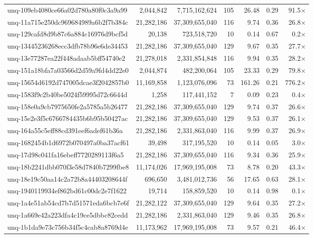 \begin{table}[h!]
\begin{tabular}{lrrrrrr}
unq-109eb4080ce66a02d780a80f0c3a9a99 & 2,044,842 & 7,715,162,624 & 105 & 26.48 & 0.29 & 91.5$\times$ \\
unq-11a715e250dc969684989a6b2f7b384c & 21,282,186 & 37,309,655,040 & 116 & 9.74 & 0.36 & 26.8$\times$ \\
unq-129cafd8d9b87c6a884c16976d9bcf5d & 20,138 & 723,518,720 & 10 & 0.14 & 0.67 & 0.2$\times$ \\
unq-13445236268ecc3dfb78b96e6de34453 & 21,282,186 & 37,309,655,040 & 129 & 9.67 & 0.35 & 27.7$\times$ \\
unq-13e77287ea22f448adaab5bff54740e2 & 21,278,018 & 2,331,854,848 & 116 & 9.94 & 0.35 & 28.2$\times$ \\
unq-151a18bfa7a03566d2d59a9fd4dd22e0 & 2,044,874 & 482,200,064 & 105 & 23.33 & 0.29 & 79.8$\times$ \\
unq-15654d6192d747005dcae3f2042857b0 & 11,169,858 & 1,123,076,096 & 73 & 161.26 & 0.21 & 776.2$\times$ \\
unq-1583f9c2b40be5024f59995d72c6644d & 1,258 & 117,441,152 & 7 & 0.09 & 0.23 & 0.4$\times$ \\
unq-158e0a9cb7975650fe2a5785a5b26477 & 21,282,186 & 37,309,655,040 & 129 & 9.74 & 0.37 & 26.6$\times$ \\
unq-15e2e3f5c6766784435b6b95b50427ac & 21,282,186 & 37,309,655,040 & 129 & 9.53 & 0.37 & 26.1$\times$ \\
unq-164a55c5eff88cd391eef6adef61b36a & 21,282,186 & 2,331,863,040 & 116 & 9.99 & 0.37 & 26.9$\times$ \\
unq-1682454b1d6972b070497a0ba37acf61 & 39,498 & 317,195,520 & 10 & 0.14 & 0.05 & 3.0$\times$ \\
unq-17d98c041fa16ebeff7720289113f6a5 & 21,282,186 & 37,309,655,040 & 116 & 9.34 & 0.36 & 25.9$\times$ \\
unq-18b2241dbb070f3e58d7840b7299fbe8 & 11,174,026 & 17,969,195,008 & 73 & 8.78 & 0.20 & 43.3$\times$ \\
unq-18e19c50aa14c2a72b8a44403208644f & 696,650 & 3,481,012,736 & 56 & 17.65 & 0.63 & 28.1$\times$ \\
unq-1940119934ef862bd61c00dc2e7f1622 & 19,714 & 158,859,520 & 10 & 0.14 & 0.98 & 0.1$\times$ \\
unq-1a4e51ab54cd7b7d51571eda6bcb7e6f & 21,282,122 & 37,309,655,040 & 129 & 9.64 & 0.35 & 27.2$\times$ \\
unq-1a669e42a223dfa4c19ce5dbbc82cedd & 21,282,186 & 2,331,863,040 & 129 & 9.46 & 0.35 & 26.8$\times$ \\
unq-1b1da9e73c756b34f5c4cab8a8769d4e & 11,173,962 & 17,969,195,008 & 73 & 9.57 & 0.21 & 46.4$\times$ \\

\end{tabular}
\end{table}
